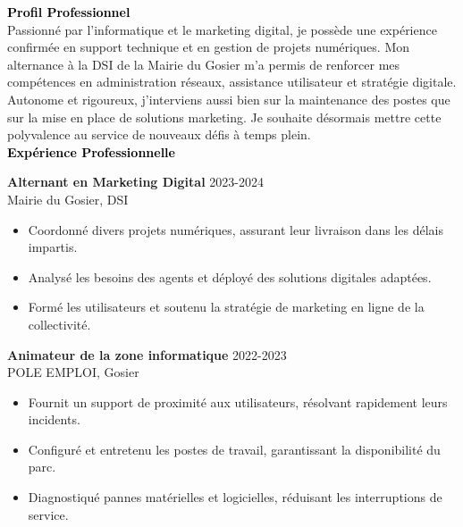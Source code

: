\documentclass{article}
\begin{document}
\begin{paracol}{2}
\switchcolumn
\color{black}

\textcolor{black}{\Large \textbf{Profil Professionnel}} \\[2pt]
Passionné par l’informatique et le marketing digital, je possède une expérience confirmée en support technique et en gestion de projets numériques. Mon alternance à la DSI de la Mairie du Gosier m’a permis de renforcer mes compétences en administration réseaux, assistance utilisateur et stratégie digitale. Autonome et rigoureux, j’interviens aussi bien sur la maintenance des postes que sur la mise en place de solutions marketing. Je souhaite désormais mettre cette polyvalence au service de nouveaux défis à temps plein. \\[8pt]

\textcolor{black}{\Large \textbf{Expérience Professionnelle}} \\[2pt]

\colorbox{maincolor}{%
  \begin{minipage}{\linewidth}
    \textbf{Alternant en Marketing Digital}              2023-2024  \\ Mairie du Gosier, DSI 
    \begin{itemize}
      \item Coordonné divers projets numériques, assurant leur livraison dans les délais impartis. \item Analysé les besoins des agents et déployé des solutions digitales adaptées. \item Formé les utilisateurs et soutenu la stratégie de marketing en ligne de la collectivité.
    \end{itemize}
  \end{minipage}}

\vspace{3mm}


\colorbox{maincolor}{%
  \begin{minipage}{\linewidth}
    \textbf{Animateur de la zone informatique}              2022-2023  \\ POLE EMPLOI, Gosier 
    \begin{itemize}
      \item Fournit un support de proximité aux utilisateurs, résolvant rapidement leurs incidents. \item Configuré et entretenu les postes de travail, garantissant la disponibilité du parc. \item Diagnostiqué pannes matérielles et logicielles, réduisant les interruptions de service.
    \end{itemize}
  \end{minipage}}


\end{paracol}
\end{document}
